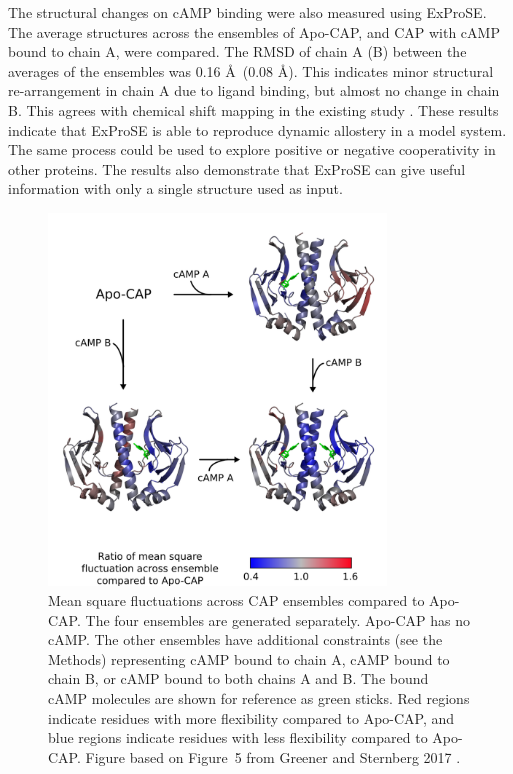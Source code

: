The structural changes on cAMP binding were also measured using ExProSE.
The average structures across the ensembles of Apo-CAP, and CAP with cAMP bound to chain A, were compared.
The RMSD of chain A (B) between the averages of the ensembles was 0.16 \AA\ (0.08 \AA).
This indicates minor structural re-arrangement in chain A due to ligand binding, but almost no change in chain B.
This agrees with chemical shift mapping in the existing study \cite{Popovych2006}.
These results indicate that ExProSE is able to reproduce dynamic allostery in a model system.
The same process could be used to explore positive or negative cooperativity in other proteins.
The results also demonstrate that ExProSE can give useful information with only a single structure used as input.


\begin{figure}
\centering

\includegraphics[width=0.8\textwidth]{figures/cap/cap}

\caption{Mean square fluctuations across CAP ensembles compared to Apo-CAP.
The four ensembles are generated separately.
Apo-CAP has no cAMP.
The other ensembles have additional constraints (see the Methods) representing cAMP bound to chain A, cAMP bound to chain B, or cAMP bound to both chains A and B.
The bound cAMP molecules are shown for reference as green sticks.
Red regions indicate residues with more flexibility compared to Apo-CAP, and blue regions indicate residues with less flexibility compared to Apo-CAP.
Figure based on Figure~5 from Greener and Sternberg 2017 \cite{Greener2017}.}

\label{fig:cap}
\end{figure}


